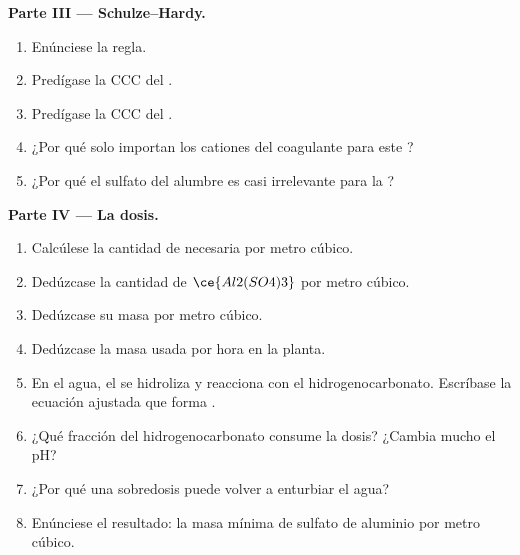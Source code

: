 \begin{problem}
\medskip\noindent\textbf{Parte III --- Schulze--Hardy.}
\begin{enumerate}[resume]
  \item Enúnciese la regla.
  \item Predígase la CCC del .
  \item Predígase la CCC del .
  \item ¿Por qué solo importan los cationes del coagulante para este ?
  \item ¿Por qué el sulfato del alumbre es casi irrelevante para la ?
\end{enumerate}

\medskip\noindent\textbf{Parte IV --- La dosis.}
\begin{enumerate}[resume]
  \item Calcúlese la cantidad de  necesaria por metro cúbico.
  \item Dedúzcase la cantidad de $\ce{Al2(SO4)3}$ por metro cúbico.
  \item Dedúzcase su masa por metro cúbico.
  \item Dedúzcase la masa usada por hora en la planta.
  \item En el agua, el  se hidroliza y reacciona con el hidrogenocarbonato. Escríbase la
        ecuación ajustada que forma .
  \item ¿Qué fracción del hidrogenocarbonato consume la dosis? ¿Cambia mucho el
        pH?
  \item ¿Por qué una sobredosis puede volver a enturbiar el agua?
  \item Enúnciese el resultado: la masa mínima de sulfato de aluminio por metro cúbico.
\end{enumerate}
\end{problem}
